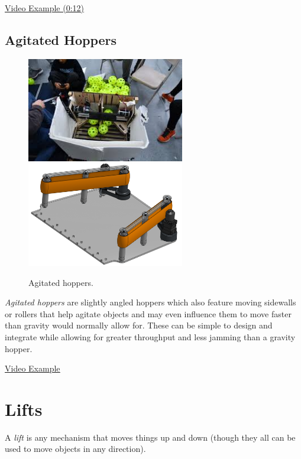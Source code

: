 \href{https://youtu.be/ewTCvLp5EUo?t=12}{\color{red}\underline{Video Example (0:12)}}
\subsection{Agitated Hoppers}

\begin{figure}[H]
	\includegraphics[height=1.8in]{imgs/hopper_agitated_1.jpeg}
	\includegraphics[height=1.8in]{imgs/hopper_agitated_2.png}
	\caption{Agitated hoppers.}
\end{figure}

\textit{Agitated hoppers} are slightly angled hoppers which also feature moving sidewalls or rollers that help agitate objects and may even influence them to move faster than gravity would normally allow for. These can be simple to design and integrate while allowing for greater throughput and less jamming than a gravity hopper. 

\href{https://www.youtube.com/watch?v=9vIrTnXu7ho}{\color{red}\underline{Video Example}}
\section{Lifts}

A \textit{lift} is any mechanism that moves things up and down (though they all can be used to move objects in any direction). 

